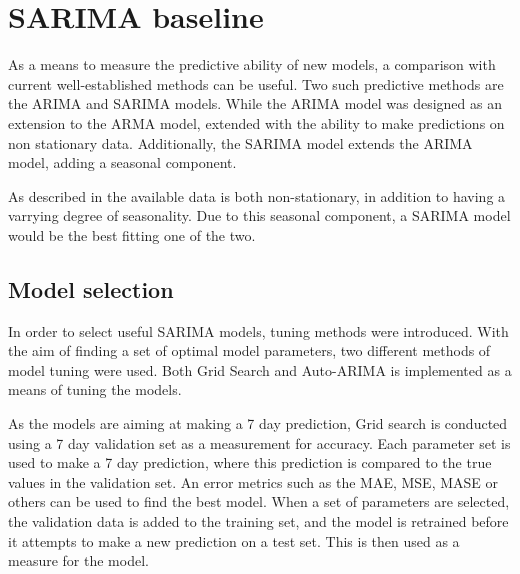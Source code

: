 
\section{SARIMA baseline}
\label{section:Architecture:Baselines:Arima}

\iffalse
This section presents the overarching methods and method architectures used in this thesis.
In an effort to analyse data and make predictions on the problem space, predictive models are applied.
Using well established methods, we intend on creating baseline predictions in order to evaluate a new model.
These baseline methods are presented here.
\fi


As a means to measure the predictive ability of new models, a comparison with current well-established methods can be useful.
Two such predictive methods are the ARIMA and SARIMA models.
While the ARIMA model was designed as an extension to the ARMA model, extended with the ability to make predictions on non stationary data.
Additionally, the SARIMA model extends the ARIMA model, adding a seasonal component.

As described in  the available data is both non-stationary, in addition to having a varrying degree of seasonality.
Due to this seasonal component, a SARIMA model would be the best fitting one of the two.


\subsection{Model selection}
In order to select useful SARIMA models, tuning methods were introduced.
With the aim of finding a set of optimal model parameters, two different methods of model tuning were used.
Both Grid Search and Auto-ARIMA is implemented as a means of tuning the models.%

As the models are aiming at making a 7 day prediction, Grid search is conducted using a 7 day validation set as a measurement for accuracy.
Each parameter set is used to make a 7 day prediction, where this prediction is compared to the true values in the validation set.
An error metrics such as the MAE, MSE, MASE or others can be used to find the best model.
When a set of parameters are selected, the validation data is added to the training set, and the model is retrained before it attempts to make a new prediction on a test set.
This is then used as a measure for the model.

